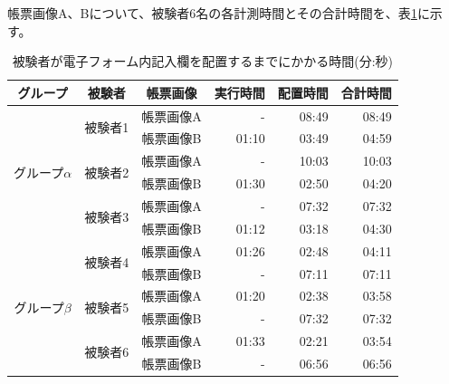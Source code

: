 帳票画像A、Bについて、被験者6名の各計測時間とその合計時間を、表\ref{tb:result_time}に示す。
\begin{table}[tp]
    \caption{被験者が電子フォーム内記入欄を配置するまでにかかる時間(分:秒)}
	\label{tb:result_time}
    \centering
    \begin{tabular}{ccc||rrr} 
    グループ & 被験者 & 帳票画像 & 実行時間 & 配置時間 & 合計時間 \\
    \hline \hline
    
    \multirow{6}{*}{グループ$\alpha$} & \multirow{2}{*}{被験者1} & 帳票画像A & - & 08:49 & 08:49 \\ %
                                                            & & 帳票画像B & 01:10 & 03:49 & 04:59 \\ 

                                    & \multirow{2}{*}{被験者2} & 帳票画像A & - & 10:03 & 10:03 \\ %
                                                            & & 帳票画像B & 01:30 & 02:50 & 04:20 \\
                                                            
                                    & \multirow{2}{*}{被験者3} & 帳票画像A & - & 07:32 & 07:32 \\ %
                                                            & & 帳票画像B & 01:12 & 03:18 & 04:30 \\
                                                            

                                                            \hline
    \multirow{6}{*}{グループ$\beta$} & \multirow{2}{*}{被験者4} & 帳票画像A & 01:26 & 02:48 & 04:11 \\ %
                                                            & & 帳票画像B & - & 07:11 & 07:11 \\
                                                            
                                    & \multirow{2}{*}{被験者5} & 帳票画像A & 01:20 & 02:38 & 03:58 \\ %
                                                            & & 帳票画像B & - & 07:32 & 07:32 \\ 
                                                            
                                    & \multirow{2}{*}{被験者6} & 帳票画像A & 01:33 & 02:21 & 03:54 \\
                                                            & & 帳票画像B & - & 06:56 & 06:56 \\ 

    \end{tabular}
\end{table}
